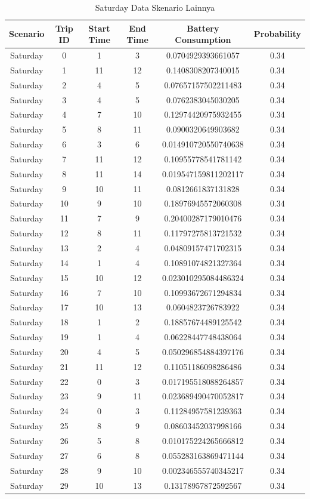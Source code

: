 \documentclass{skripsimathugm}
\begin{document}
\begin{table}[H]
\centering
\caption{Saturday Data Skenario Lainnya}
\label{Saturday Data Skenario Lainnya}
\begin{tabular}{|c|c|c|c|c|c|}
\hline
\textbf{Scenario} & \textbf{Trip ID} & \textbf{Start Time} & \textbf{End Time} & \textbf{Battery Consumption} & \textbf{Probability} \\
\hline
Saturday & 0 & 1 & 3 & 0.0704929393661057 & 0.34 \\
Saturday & 1 & 11 & 12 & 0.1408308207340015 & 0.34 \\
Saturday & 2 & 4 & 5 & 0.07657157502211483 & 0.34 \\
Saturday & 3 & 4 & 5 & 0.0762383045030205 & 0.34 \\
Saturday & 4 & 7 & 10 & 0.12974420975932455 & 0.34 \\
Saturday & 5 & 8 & 11 & 0.0900320649903682 & 0.34 \\
Saturday & 6 & 3 & 6 & 0.014910720550740638 & 0.34 \\
Saturday & 7 & 11 & 12 & 0.10955778541781142 & 0.34 \\
Saturday & 8 & 11 & 14 & 0.019547159811202117 & 0.34 \\
Saturday & 9 & 10 & 11 & 0.0812661837131828 & 0.34 \\
Saturday & 10 & 9 & 10 & 0.18976945572060308 & 0.34 \\
Saturday & 11 & 7 & 9 & 0.20400287179010476 & 0.34 \\
Saturday & 12 & 8 & 11 & 0.11797275813721532 & 0.34 \\
Saturday & 13 & 2 & 4 & 0.04809157471702315 & 0.34 \\
Saturday & 14 & 1 & 4 & 0.10891074821327364 & 0.34 \\
Saturday & 15 & 10 & 12 & 0.023010295084486324 & 0.34 \\
Saturday & 16 & 7 & 10 & 0.10993672671294834 & 0.34 \\
Saturday & 17 & 10 & 13 & 0.0604823726783922 & 0.34 \\
Saturday & 18 & 1 & 2 & 0.18857674489125542 & 0.34 \\
Saturday & 19 & 1 & 4 & 0.06228447748438064 & 0.34 \\
Saturday & 20 & 4 & 5 & 0.050296854884397176 & 0.34 \\
Saturday & 21 & 11 & 12 & 0.11051186098286486 & 0.34 \\
Saturday & 22 & 0 & 3 & 0.017195518088264857 & 0.34 \\
Saturday & 23 & 9 & 11 & 0.023689490470052817 & 0.34 \\
Saturday & 24 & 0 & 3 & 0.11284957581239363 & 0.34 \\
Saturday & 25 & 8 & 9 & 0.08603452037998166 & 0.34 \\
Saturday & 26 & 5 & 8 & 0.010175224265666812 & 0.34 \\
Saturday & 27 & 6 & 8 & 0.055283163869471144 & 0.34 \\
Saturday & 28 & 9 & 10 & 0.002346555740345217 & 0.34 \\
Saturday & 29 & 10 & 13 & 0.13178957872592567 & 0.34 \\
\hline
\end{tabular}
\end{table}
\end{document}
